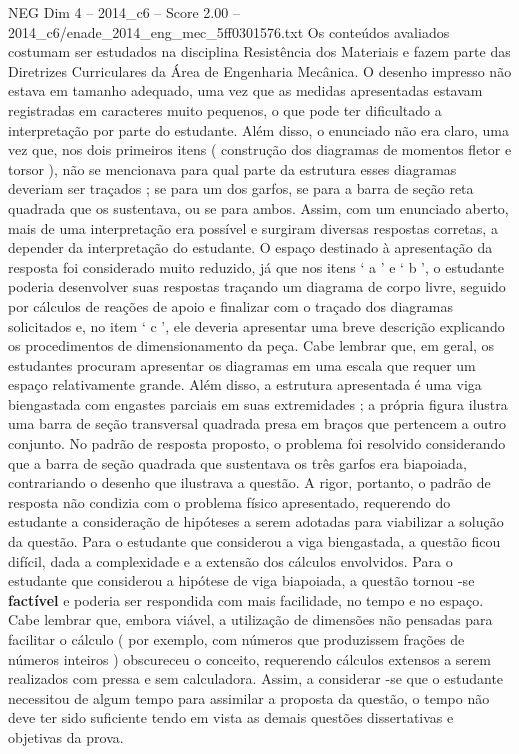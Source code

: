 \begin{textsample}{NEG Dim 4 – 2014\_c6 – Score 2.00 – 2014\_c6/enade\_2014\_eng\_mec\_5ff0301576.txt}
Os conteúdos avaliados costumam ser estudados na disciplina Resistência dos Materiais e fazem parte das Diretrizes Curriculares da Área de Engenharia Mecânica.
O desenho impresso não estava em tamanho adequado, uma vez que as medidas apresentadas estavam registradas em caracteres muito pequenos, o que pode ter dificultado a interpretação por parte do estudante.
Além disso, o enunciado não era claro, uma vez que, nos dois primeiros itens ( construção dos diagramas de momentos fletor e torsor ), não se mencionava para qual parte da estrutura esses diagramas deveriam ser traçados ; se para um dos garfos, se para a barra de seção reta quadrada que os sustentava, ou se para ambos.
Assim, com um enunciado aberto, mais de uma interpretação era possível e surgiram diversas respostas corretas, a depender da interpretação do estudante.
O espaço destinado à apresentação da resposta foi considerado muito reduzido, já que nos itens ‘ a ’ e ‘ b ’, o estudante poderia desenvolver suas respostas traçando um diagrama de corpo livre, seguido por cálculos de reações de apoio e finalizar com o traçado dos diagramas solicitados e, no item ‘ c ’, ele deveria apresentar uma breve descrição explicando os procedimentos de dimensionamento da peça.
Cabe lembrar que, em geral, os estudantes procuram apresentar os diagramas em uma escala que requer um espaço relativamente grande.
Além disso, a estrutura apresentada é uma viga biengastada com engastes parciais em suas extremidades ; a própria figura ilustra uma barra de seção transversal quadrada presa em braços que pertencem a outro conjunto.
No padrão de resposta proposto, o problema foi resolvido considerando que a barra de seção quadrada que sustentava os três garfos era biapoiada, contrariando o desenho que ilustrava a questão.
A rigor, portanto, o padrão de resposta não condizia com o problema físico apresentado, requerendo do estudante a consideração de hipóteses a serem adotadas para viabilizar a solução da questão.
Para o estudante que considerou a viga biengastada, a questão ficou difícil, dada a complexidade e a extensão dos cálculos envolvidos.
Para o estudante que considerou a hipótese de viga biapoiada, a questão tornou -se \textbf{factível} e poderia ser respondida com mais facilidade, no tempo e no espaço.
Cabe lembrar que, embora viável, a utilização de dimensões não pensadas para facilitar o cálculo ( por exemplo, com números que produzissem frações de números inteiros ) obscureceu o conceito, requerendo cálculos extensos a serem realizados com pressa e sem calculadora.
Assim, a considerar -se que o estudante necessitou de algum tempo para assimilar a proposta da questão, o tempo não deve ter sido suficiente tendo em vista as demais questões dissertativas e objetivas da prova.

\end{textsample}
